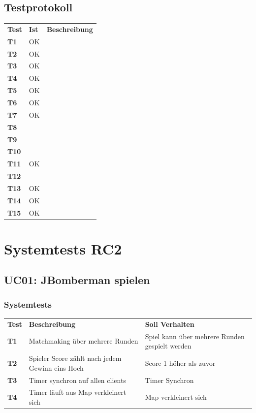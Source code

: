 \documentclass[11pt]{scrartcl}
\begin{document}
\subsection{Testprotokoll}
\begin{tabularx}{\linewidth}{l l X}
  \bf{Test} & \bf{Ist} & \bf{Beschreibung} \\
  \bf{T1} & OK & \\
  \bf{T2} & OK &  \\
  \bf{T3} & OK  & \\
  \bf{T4} & OK &  \\
  \bf{T5} & OK & \\
  \bf{T6} & OK &  \\
  \bf{T7} & OK & \\
  \bf{T8} & &  \\
  \bf{T9} & & \\
  \bf{T10} & & \\
  \bf{T11} & OK & \\
  \bf{T12} & & \\
  \bf{T13} & OK &  \\
  \bf{T14} & OK &  \\
  \bf{T15} & OK & \\
\end{tabularx}

\section{Systemtests RC2}
\subsection{UC01: JBomberman spielen}
\subsubsection{Systemtests}
\begin{tabularx}{\linewidth}{l X X}
  \bf{Test} & \bf{Beschreibung} & \bf{Soll Verhalten} \\
 \bf{T1} & Matchmaking über mehrere Runden & Spiel kann über mehrere 
 Runden gespielt werden \\
 \bf{T2} & Spieler Score zählt nach jedem Gewinn eins Hoch & Score 1 höher als 
 zuvor \\
 \bf{T3} & Timer synchron auf allen clients & Timer Synchron \\
 \bf{T4} & Timer läuft aus Map verkleinert sich & Map verkleinert sich \\
 
 \end{tabularx}
\end{document}
